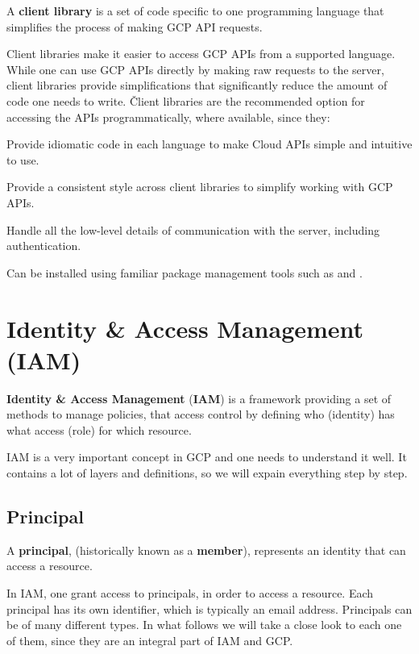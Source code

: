 A \textbf{client library} is a set of code specific to one programming language that simplifies the process of making
GCP API requests.
\ed

Client libraries make it easier to access GCP APIs from a supported language. While one can use GCP APIs directly by
making raw requests to the server, client libraries provide simplifications that significantly reduce the amount of
code one needs to write. \v

Client libraries are the recommended option for accessing the APIs programmatically, where available, since they:
\bit
\item Provide idiomatic code in each language to make Cloud APIs simple and intuitive to use.
\item Provide a consistent style across client libraries to simplify working with GCP APIs.
\item Handle all the low-level details of communication with the server, including authentication.
\item Can be installed using familiar package management tools such as  and .
\eit

\section{Identity \& Access Management (IAM)}

\textbf{Identity \& Access Management} (\textbf{IAM}) is a framework providing a set of methods to manage policies,
that access control by defining who (identity) has what access (role) for which resource.
\ed

IAM is a very important concept in GCP and one needs to understand it well. It contains a lot of layers and definitions,
so we will expain everything step by step.

\subsection{Principal}

\bd[Principal]
A \textbf{principal}, (historically known as a \textbf{member}), represents an identity that can access a resource.
\ed

In IAM, one grant access to principals, in order to access a resource. Each principal has its own identifier, which is
typically an email address. Principals can be of many different types. In what follows we will take a close look to
each one of them, since they are an integral part of IAM and GCP\@.

